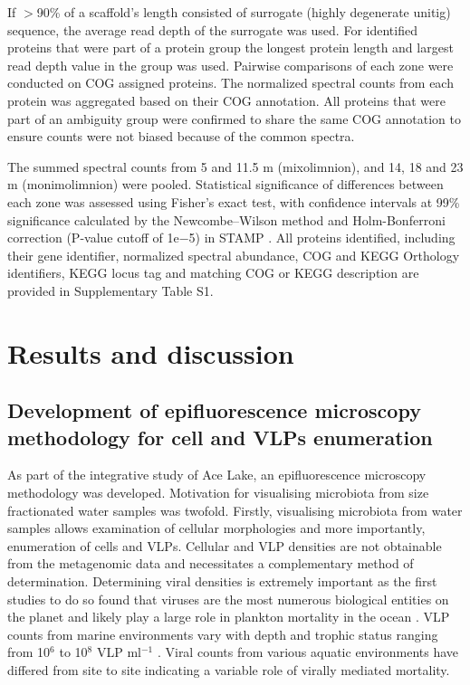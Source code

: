 If $>$90\% of a scaffold’s length consisted of surrogate (highly degenerate unitig) sequence, the average read depth of the surrogate was used. 
For identified proteins that were part of a protein group the longest protein length and largest read depth value in the group was used. 
Pairwise comparisons of each zone were conducted on COG assigned proteins. 
The normalized spectral counts from each protein was aggregated based on their \ac{COG} annotation. 
All proteins that were part of an ambiguity group were confirmed to share the same \ac{COG} annotation to ensure counts were not biased because of the common spectra.

The summed spectral counts from 5 and 11.5 m (mixolimnion), and 14, 18 and 23 m (monimolimnion) were pooled. 
Statistical significance of differences between each zone was assessed using Fisher's exact test, with confidence intervals at 99\% significance calculated by the Newcombe–Wilson method and Holm-Bonferroni correction (P-value cutoff of 1e$-$5) in \ac{STAMP} \cite{Parks2010}. 
All proteins identified, including their gene identifier, normalized spectral abundance, \ac{COG} and \ac{KEGG} Orthology identifiers, \ac{KEGG} locus tag and matching \ac{COG} or \ac{KEGG} description are provided in Supplementary Table S1.




\section{Results and discussion}

\subsection[Epifluorescence microscopy methodology]{Development of epifluorescence microscopy methodology for cell and \acp{VLP} enumeration}
As part of the integrative study of Ace Lake, an epifluorescence microscopy methodology was developed.
Motivation for visualising microbiota from size fractionated water samples was twofold. 
Firstly, visualising microbiota from water samples allows examination of cellular morphologies and more importantly, enumeration of cells and \acp{VLP}.
Cellular and \ac{VLP} densities are not obtainable from the metagenomic data and necessitates a complementary method of determination.
Determining viral densities is extremely important as the first studies to do so found that viruses are the most numerous biological entities on the planet and likely play a large role in plankton mortality in the ocean \cite{Bergh1989,Proctor1990}. %
\ac{VLP} counts from marine environments vary with depth and trophic status ranging from 10$^6$ to 10$^8$ \acs{VLP} ml$^{-1}$ \cite{Suttle2005}.
Viral counts from various aquatic environments have differed from site to site indicating a variable role of virally mediated mortality. %

